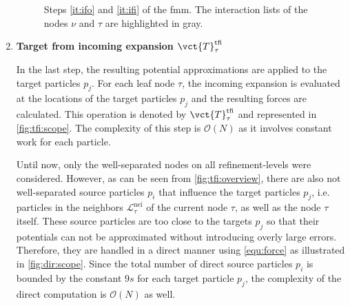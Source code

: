 \begin{enumerate}
\begin{figure}
{
        }
      \hfill\null
      \caption{Steps \ref{it:ifo} and \ref{it:ifi} of the \gls{fmm}. The interaction lists of the nodes $\nu$ and $\tau$ are highlighted in gray.}
      \label{fig:ifo}
    \end{figure}
    \label{it:ifi}

  \item \textbf{Target from incoming expansion $\vct{T}_{\tau}^{\mathrm{tfi}}$}

    In the last step, the resulting potential approximations are applied to the target particles $p_j$.
    For each leaf node $\tau$, the incoming expansion is evaluated at the locations of the target particles $p_j$ and the resulting forces are calculated.
    This operation is denoted by $\vct{T}_{\tau}^{\mathrm{tfi}}$ and represented in \cref{fig:tfi:scope}.
    The complexity of this step is $\mathcal{O}(N)$ as it involves constant work for each particle.

    Until now, only the well-separated nodes on all refinement-levels were considered.
    However, as can be seen from \cref{fig:tfi:overview}, there are also not well-separated source particles $p_i$ that influence the target particles $p_j$, i.e. particles in the neighbors $\mathcal{L}_{\tau}^{\mathrm{nei}}$ of the current node $\tau$, as well as the node $\tau$ itself.
    These source particles are too close to the targets $p_j$ so that their potentials can not be approximated without introducing overly large errors.
    Therefore, they are handled in a direct manner using \cref{equ:force} as illustrated in \cref{fig:dir:scope}.
    Since the total number of direct source particles $p_i$ is bounded by the constant $9s$ for each target particle $p_j$, the complexity of the direct computation is $\mathcal{O}(N)$ as well.

    \begin{figure}
      \centering
      \null\hfill
\end{figure}
\end{enumerate}

